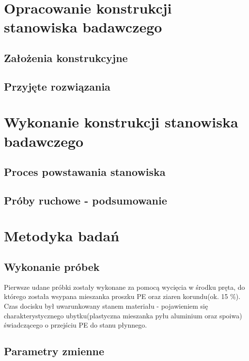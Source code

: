 \documentclass[magister,druk]{dyplom}
\begin{document}
\chapter{Opracowanie konstrukcji stanowiska badawczego}
\section{Założenia konstrukcyjne}
\section{Przyjęte rozwiązania}

\chapter{Wykonanie konstrukcji stanowiska badawczego}
\section{Proces powstawania stanowiska}
\section{Próby ruchowe - podsumowanie}

\chapter{Metodyka badań}
\section{Wykonanie próbek}

Pierwsze udane próbki zostały wykonane za pomocą wycięcia w środku pręta, do którego została wsypana mieszanka proszku PE oraz ziaren korundu(ok. 15 \%). Czas docisku był uwarunkowany stanem materiału - pojawieniem się charakterystycznego ubytku(plastyczna mieszanka pyłu aluminium oraz spoiwa) świadczącego o przejściu PE do stanu płynnego. 

\section{Parametry zmienne}
\end{document}
